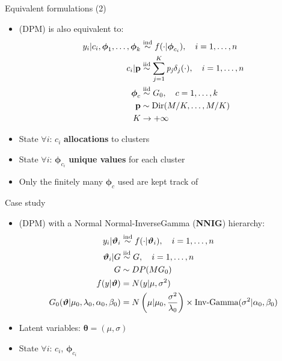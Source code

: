\begin{frame}{Equivalent formulations (2)} %
	\begin{itemize}
		\item (DPM) is also equivalent to:
		\begin{align*}
		y_{i}|c_i,\boldsymbol\phi_1,\dots,\boldsymbol\phi_k &\stackrel{\text{ind}}{\sim} f(\cdot|\boldsymbol\phi_{c_{i}}), \quad i=1,\dots,n \\
		c_{i}|\mathit{\mathbf{p}}&\stackrel{\text{iid}}{\sim} \sum_{j=1}^K\mathit{p_j} \delta_j(\cdot), \quad i=1,\dots,n \\
		\boldsymbol\phi_{c} & \stackrel{\text{iid}}{\sim} G_{0}, \quad c=1,\dots,k \\
		\mathbf{p} &\sim \operatorname{Dir}(M/K,\dots,M/K) \\
		K &\to +\infty
		\end{align*}
		\item State $\forall i$: $c_i$ \textbf{allocations} to clusters
		\item State $\forall i$: $\boldsymbol\phi_{c_i}$ \textbf{unique values} for each cluster
		\item Only the finitely many $\boldsymbol\phi_{c}$ used are kept track of
	\end{itemize}
\end{frame}


\begin{frame}{Case study} %
	\begin{itemize}
		\item (DPM) with a Normal Normal-InverseGamma (\textbf{NNIG}) hierarchy:
		\begin{align*}
		y_i | \boldsymbol{\vartheta}_i &\stackrel{\text{ind}}{\sim} f(\cdot|\boldsymbol{\vartheta}_i), \quad i=1,\dots,n \\
		\boldsymbol{\vartheta}_i | G &\stackrel{\text{iid}}{\sim} G, \quad i=1,\dots,n \\ 
		G &\sim DP(M G_0) \\
		f(y|\boldsymbol{\vartheta})&=N(y| \mu ,\sigma^2)  \\
		G_0(\boldsymbol{\vartheta}|\mu_0,\lambda_0, \alpha_0, 	\beta_0)
		&=N\left(\mu | \mu_0 ,\frac{\sigma^2} {\lambda_0}\right) \times \text{Inv-Gamma}(\sigma^2|\alpha_0, \beta_0 )
		\end{align*}
		\item Latent variables: $\boldsymbol\theta = (\mu,\sigma)$
		\item State $\forall i$: $c_i$, $\boldsymbol\phi_{c_i}$
	\end{itemize}
\end{frame}



